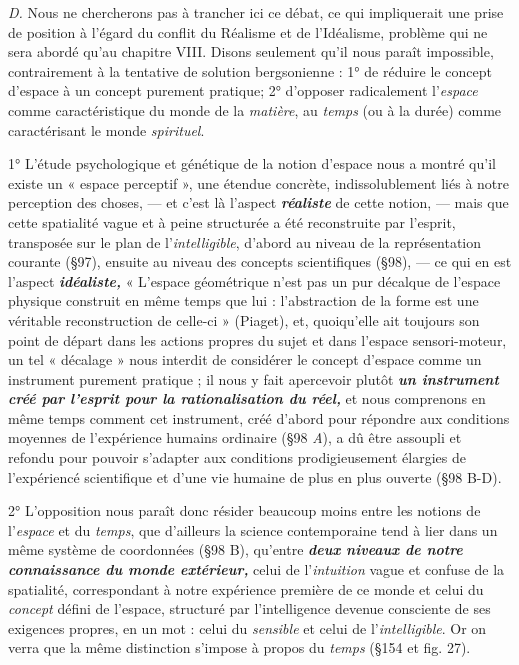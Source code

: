 {\it D.} Nous ne chercherons pas à trancher ici ce débat, ce qui impliquerait
une prise de position à l'égard du conflit du Réalisme et de
l’Idéalisme, problème qui ne sera abordé qu’au chapitre VIII. Disons
seulement qu’il nous paraît impossible, contrairement à la tentative
de solution bergsonienne : 1° de réduire le concept d’espace à un
concept purement pratique; 2° d’opposer radicalement l’{\it espace}
comme caractéristique du monde de la {\it matière}, au {\it temps} (ou à la
durée) comme caractérisant le monde {\it spirituel}.

1° L'étude psychologique et génétique de la notion d’espace nous
a montré qu’il existe un « espace perceptif », une étendue concrète,
indissolublement liés à notre perception des choses, — et c’est là
l’aspect \textbf{\textit {réaliste}} de cette notion, — mais que cette spatialité vague et
à peine structurée a été reconstruite par l'esprit, transposée sur le
plan de l’{\it intelligible}, d’abord au niveau de la représentation courante
(\S 97), ensuite au niveau des concepts scientifiques (\S 98), —
ce qui en est l’aspect \textbf{\textit {idéaliste,}} « L'espace géométrique n’est pas un
pur décalque de l’espace physique construit en même temps que lui :
l’abstraction de la forme est une véritable reconstruction de celle-ci »
(Piaget), et, quoiqu’elle ait toujours son point de départ dans les
actions propres du sujet et dans l’espace sensori-moteur, un tel
« décalage » nous interdit de considérer le concept d’espace comme un
instrument purement pratique ; il nous y fait apercevoir plutôt \textbf{\textit {un
instrument créé par l'esprit pour la rationalisation du réel,}} et nous
comprenons en même temps comment cet instrument, créé d’abord
pour répondre aux conditions moyennes de l’expérience humains
ordinaire (\S 98 {\it A}), a dû être assoupli et refondu pour pouvoir
s’adapter aux conditions prodigieusement élargies de l’expériencé
scientifique et d’une vie humaine de plus en plus ouverte (\S 98 B-D).

2° L'opposition nous paraît donc résider beaucoup moins entre
les notions de l’{\it espace} et du {\it temps}, que d'ailleurs la science contemporaine
tend à lier dans un même système de coordonnées (\S 98 B),
qu'entre \textbf{\textit {deux niveaux de notre connaissance du monde extérieur,}}
celui de l'{\it intuition} vague et confuse de la spatialité, correspondant à
notre expérience première de ce monde et celui du {\it concept} défini de
l’espace, structuré par l’intelligence devenue consciente de ses exigences
propres, en un mot : celui du {\it sensible} et celui de l’{\it intelligible}.
Or on verra que la même distinction s'impose à propos du {\it temps}
(\S 154 et fig. 27).

